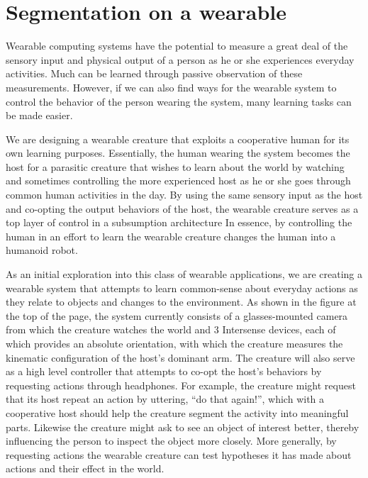 






\section{Segmentation on a wearable}

Wearable computing systems have the potential to measure a great deal
of the sensory input and physical output of a person as he or she
experiences everyday activities. Much can be learned through passive
observation of these measurements. However, if we can also find ways
for the wearable system to control the behavior of the person wearing
the system, many learning tasks can be made easier.

We are designing a wearable creature that exploits a cooperative human
for its own learning purposes. Essentially, the human wearing the
system becomes the host for a parasitic creature that wishes to learn
about the world by watching and sometimes controlling the more
experienced host as he or she goes through common human activities in
the day. By using the same sensory input as the host and co-opting the
output behaviors of the host, the wearable creature serves as a top
layer of control in a subsumption architecture In essence, by
controlling the human in an effort to learn the wearable creature
changes the human into a humanoid robot.

As an initial exploration into this class of wearable applications, we
are creating a wearable system that attempts to learn common-sense
about everyday actions as they relate to objects and changes to the
environment. As shown in the figure at the top of the page, the system
currently consists of a glasses-mounted camera from which the creature
watches the world and 3 Intersense devices, each of which provides an
absolute orientation, with which the creature measures the kinematic
configuration of the host's dominant arm. The creature will also serve
as a high level controller that attempts to co-opt the host's
behaviors by requesting actions through headphones. For example, the
creature might request that its host repeat an action by uttering,
``do that again!'', which with a cooperative host should help the
creature segment the activity into meaningful parts. Likewise the
creature might ask to see an object of interest better, thereby
influencing the person to inspect the object more closely. More
generally, by requesting actions the wearable creature can test
hypotheses it has made about actions and their effect in the world.

